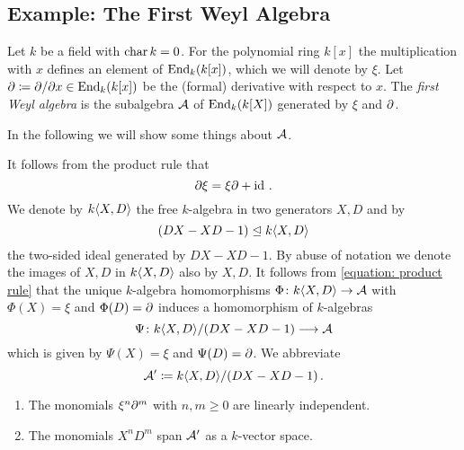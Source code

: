 \subsection{Example: The First Weyl Algebra}
\label{subsection: first weyl algebra}


\begin{fluff}
  Let $k$ be a field with $\operatorname{char} k = 0$.
  For the polynomial ring $k[x]$ the multiplication with $x$ defines an element of $\operatorname{End}_k(k[x])$, which we will denote by $\xi$.
  Let $\partial \coloneqq \partial/\partial x \in \operatorname{End}_k(k[x])$ be the (formal) derivative with respect to $x$.
  The \emph{first Weyl algebra} is the subalgebra $\mathcal{A}$ of $\operatorname{End}_k(k[X])$ generated by $\xi$ and $\partial$.
  
  In the following we will show some things about $\mathcal{A}$.
\end{fluff}


\begin{fluff}
  It follows from the product rule that
  \begin{equation}
  \label{equation: product rule}
      \partial \xi
    = \xi \partial + \operatorname{id} \,.
  \end{equation}
  We denote by $k\!\left\langle X,D \right\rangle$ the free $k$-algebra in two generators $X,D$ and by
  \[
              (DX - XD - 1)
    \trianglelefteq k\!\left\langle X,D \right\rangle
  \]
  the two-sided ideal generated by $DX - XD - 1$.
  By abuse of notation we denote the images of $X, D$ in $k\!\left\langle X,D \right\rangle$ also by $X, D$.
  It follows from \eqref{equation: product rule} that the unique $k$-algebra homomorphisms $\Phi \colon k\!\left\langle X,D \right\rangle \to \mathcal{A}$ with $\Phi(X) = \xi$ and $\Phi(D) = \partial$ induces a homomorphism of $k$-algebras
  \[
            \Psi
    \colon  k\!\left\langle X,D \right\rangle\!/(DX - XD - 1)
    \longrightarrow \mathcal{A}
  \]
  which is given by $\Psi(X) = \xi$ and $\Psi(D) = \partial$.
  We abbreviate
  \[
              \mathcal{A}'
    \coloneqq  k\!\left\langle X,D \right\rangle\!/(DX - XD - 1) \,.
  \]
\end{fluff}


\begin{lemma}
  \label{lemma: preparation for weyl basis}
  \leavevmode
  \begin{enumerate}
    \item
      The monomials $\xi^n \partial^m$ with $n, m \geq 0$ are linearly independent.
    \item
      The monomials $X^n D^m$ span $\mathcal{A}'$ as a $k$-vector space.
  \end{enumerate}
\end{lemma}


